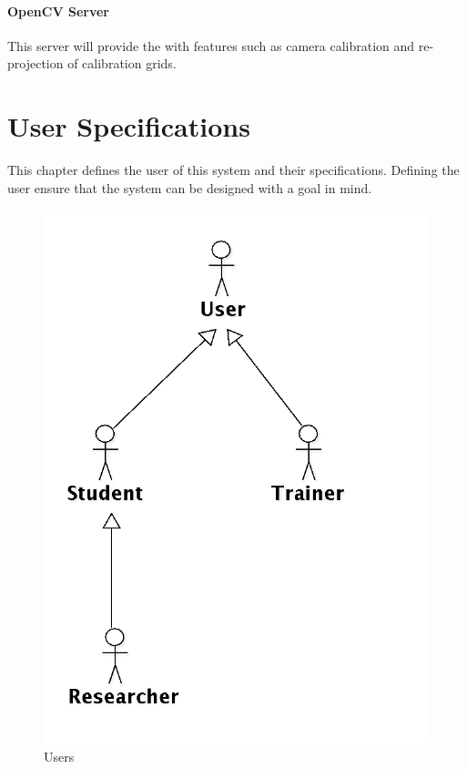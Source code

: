 \documentclass[11pt]{report}
\begin{document}
\subsubsection{OpenCV Server}

This server will provide the  with  features such as camera calibration and re-projection of calibration grids.

\chapter{User Specifications}

This chapter defines the user of this system and their specifications. Defining the user ensure that the system can be designed with a  goal in mind. 

\begin{figure}[htp]
\centering
\includegraphics[scale=0.25]{images/UserOverview.png}
\caption{Users}
\label{fig:uo}
\end{figure}
\end{document}
